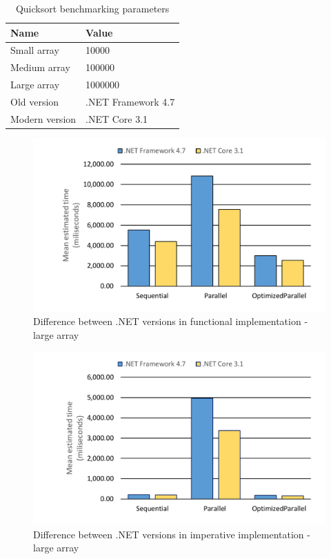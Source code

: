 \begin{table}[!ht]
    \centering
    \caption{Quicksort benchmarking parameters}
		\label{tab:QuicksortParameters}
    \begin{tabular}{p{3cm}p{4cm}}
			\toprule
			\bfseries Name 	&
			\bfseries Value \\
			\midrule
			Small array & 10000  \\
			Medium array & 100000 \\
			Large array & 1000000 \\
			Old version & .NET Framework 4.7 \\ 
			Modern version & .NET Core 3.1 \\ 
			\bottomrule
    \end{tabular}
\end{table}

\begin{figure}[htb]
\centering
\includegraphics[width=.8\linewidth]{figures04/47vsCoreFunc1000000.pdf}
\caption{Difference between .NET versions in functional implementation - large array}
\label{fig:47vsCoreFunc1000000}
\end{figure}

\begin{figure}[htb]
\centering
\includegraphics[width=.8\linewidth]{figures04/47vsCoreImp1000000.pdf}
\caption{Difference between .NET versions in imperative implementation - large array}
\label{fig:47vsCoreImp1000000}
\end{figure}

